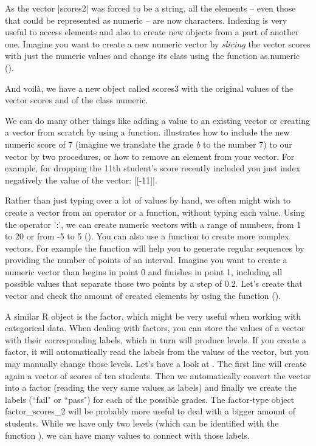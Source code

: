 As the vector |scores2| was forced to be a string, all the elements --
even those that could be represented as numeric -- are now
characters. Indexing is very useful to access elements and also to
create new objects from a part of another one. Imagine you want to
create a new numeric vector by \emph{slicing} the vector scores with
just the numeric values and change its class using the function
as.numeric ().

And voilà, we have a new object called scores3 with the original
values of the vector scores and of the class numeric.


We can do many other things like adding a value to an existing vector
or creating a vector from scratch by using a
function.  illustrates how to include the new numeric
score of 7 (imagine we translate the grade \emph{b} to the number 7)
to our vector by two procedures, or how to remove an element from your
vector. For example, for dropping the 11th student's score recently included you
just index negatively the value of the vector: |[-11]|.

Rather than just typing over a lot of values by hand, we often might
wish to create a vector from an operator or a function, without typing
each value. Using the operator ':', we can create numeric vectors with
a range of numbers, from 1 to 20 or from -5 to 5 ().
You can also use a function to create more complex vectors. For
example the function  will help you to generate regular sequences
by providing the number of points of an interval.  Imagine you want to
create a numeric vector than begins in point 0 and finishes in point
1, including all possible values that separate those two points by a
step of 0.2. Let's create that vector and check the amount of created
elements by using the function  ().

A similar R object is the factor, which might be very useful when
working with categorical data. When dealing with factors, you can
store the values of a vector with their corresponding labels, which in
turn will produce levels. If you create a factor, it will
automatically read the labels from the values of the vector, but you
may manually change those levels. Let's have a look at
.  The first line will create again a vector of scores
of ten students. Then we automatically convert the vector into a
factor (reading the very same values as labels) and finally we create
the labels (``fail" or ``pass") for each of the possible grades.  The
factor-type object factor\_scores\_2 will be probably more useful to
deal with a bigger amount of students. While we have only two levels
(which can be identified with the function ), we can have many
values to connect with those labels.

